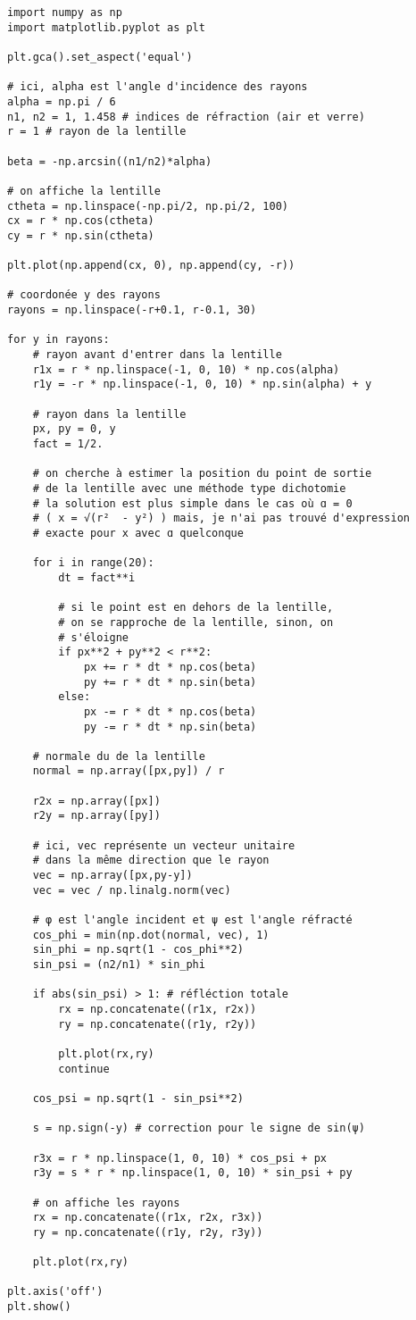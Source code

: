 \documentclass[a4paper]{report}
\begin{document}
	\begin{verbatim}
import numpy as np
import matplotlib.pyplot as plt

plt.gca().set_aspect('equal')

# ici, alpha est l'angle d'incidence des rayons
alpha = np.pi / 6
n1, n2 = 1, 1.458 # indices de réfraction (air et verre)
r = 1 # rayon de la lentille

beta = -np.arcsin((n1/n2)*alpha)

# on affiche la lentille
ctheta = np.linspace(-np.pi/2, np.pi/2, 100)
cx = r * np.cos(ctheta)
cy = r * np.sin(ctheta)

plt.plot(np.append(cx, 0), np.append(cy, -r))

# coordonée y des rayons
rayons = np.linspace(-r+0.1, r-0.1, 30)

for y in rayons:
	# rayon avant d'entrer dans la lentille
	r1x = r * np.linspace(-1, 0, 10) * np.cos(alpha)
	r1y = -r * np.linspace(-1, 0, 10) * np.sin(alpha) + y
	
	# rayon dans la lentille
	px, py = 0, y
	fact = 1/2.

	# on cherche à estimer la position du point de sortie
	# de la lentille avec une méthode type dichotomie
	# la solution est plus simple dans le cas où ɑ = 0
	# ( x = √(r²  - y²) ) mais, je n'ai pas trouvé d'expression
	# exacte pour x avec ɑ quelconque

	for i in range(20):
		dt = fact**i
		
		# si le point est en dehors de la lentille,
		# on se rapproche de la lentille, sinon, on
		# s'éloigne
		if px**2 + py**2 < r**2:
			px += r * dt * np.cos(beta)
			py += r * dt * np.sin(beta)
		else:
			px -= r * dt * np.cos(beta)
			py -= r * dt * np.sin(beta)
	
	# normale du de la lentille
	normal = np.array([px,py]) / r

	r2x = np.array([px])
	r2y = np.array([py])
	
	# ici, vec représente un vecteur unitaire
	# dans la même direction que le rayon
	vec = np.array([px,py-y])
	vec = vec / np.linalg.norm(vec)

	# φ est l'angle incident et ψ est l'angle réfracté
	cos_phi = min(np.dot(normal, vec), 1)
	sin_phi = np.sqrt(1 - cos_phi**2)
	sin_psi = (n2/n1) * sin_phi
	
	if abs(sin_psi) > 1: # réfléction totale
		rx = np.concatenate((r1x, r2x))
		ry = np.concatenate((r1y, r2y))

		plt.plot(rx,ry)
		continue
	
	cos_psi = np.sqrt(1 - sin_psi**2)
	
	s = np.sign(-y) # correction pour le signe de sin(ψ)
	
	r3x = r * np.linspace(1, 0, 10) * cos_psi + px
	r3y = s * r * np.linspace(1, 0, 10) * sin_psi + py
	
	# on affiche les rayons
	rx = np.concatenate((r1x, r2x, r3x))
	ry = np.concatenate((r1y, r2y, r3y))
	
	plt.plot(rx,ry)

plt.axis('off')
plt.show()
	\end{verbatim}
\end{document}
